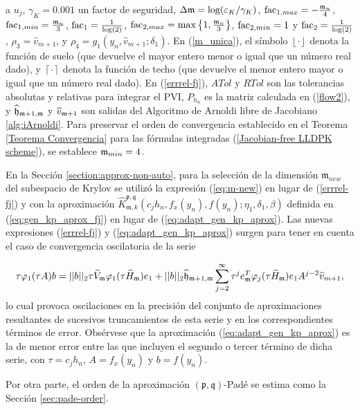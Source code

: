 a $u_j$, $\gamma_{K}=0.001$ un factor de seguridad,
$\Delta\mathfrak{m}=\log(\varepsilon_{K}/\gamma_{K})$,
$\mathrm{fac}_{1,max}= -\frac{\mathfrak{m}_n}{4}$, $\mathrm{fac}_{1,min}= \frac{\mathfrak{m}_n}{3}$, $\mathrm{fac}_1=\frac{1} {\log(2)}$, $\mathrm{fac}_{2,max}= \max\left\{  1,\frac{\mathfrak{m}_{n}}{3}  \right\}$, $\mathrm{fac}_{2,min}= 1 $ y $\mathrm{fac}_2=\frac{1}{\log(2)}$, $\rho_3 =\hat{v}_{m+1}$, y $\rho_4 = g_1(y_n,\hat{v}_ {m+1};\delta_1)$. En (\ref{m_unica}), el símbolo $\left\lfloor \cdot \right\rfloor$ denota la función de suelo (que devuelve el mayor entero menor o igual que un número real dado), y $\left\lceil \cdot \right\rceil$ denota la función de techo (que devuelve el menor entero mayor o igual que un número real dado). En (\ref{errrel-fj}), $ATol$ y $RTol$ son las tolerancias absolutas y relativas para integrar el PVI, $P_{h_n}$ es la matriz calculada en (\ref{flow2}), y $\widehat {\mathfrak{h}}_{\mathfrak{m}+1,\mathfrak{m}}$ y $\widehat{v}_{\mathfrak{m}+1}$ son salidas del Algoritmo de Arnoldi libre de Jacobiano \ref{alg:iArnoldi}. Para preservar el orden de convergencia establecido en el Teorema \ref{Teorema Convergencia} para las fórmulas integradas (\ref{Jacobian-free LLDPK scheme}), se establece $\mathfrak{m}_{min}=4$.
\begin{sloppypar}
En la Sección \ref{section:approx-non-auto}, para la selección de la dimensión $\mathfrak{m}_{new}$ del subespacio de Krylov se utilizó la expresión (\ref{eq:m-new}) en lugar de (\ref{errrel-fj}) y con la aproximación
$\widehat{K}_{\mathfrak{m},k}^{\mathfrak{p},\mathfrak{q}}\left(
c_{j}h_{n},f_{x}(y_{n}),f(y_{n});\eta _{1},\delta _{1},\beta \right)
$ definida en (\ref{eq:gen_kp_aprox_fj}) en lugar de (\ref{eq:adapt_gen_kp_aprox}). Las nuevas expresiones (\ref{errrel-fj}) y (\ref{eq:adapt_gen_kp_aprox}) surgen para tener en cuenta el caso de convergencia oscilatoria de la serie \cite{sidje1998expokit}
\end{sloppypar}
\begin{equation*}
	\tau\varphi_1(\tau A)b=||b||_2\tau \widehat{V}_{\mathfrak{m}} \varphi_1( \tau \widehat{H}_{\mathfrak{m}})e_1 + ||b||_2 \widehat{\mathfrak{h}}_{\mathfrak{m}+1,\mathfrak{m}}
	\sum_{j=2}^{\infty}\tau^{j} e_{\mathfrak{m}}^T\varphi_j(\tau \widehat{H}_{\mathfrak{m}})e_1A^{j-2}\widehat{v}_{m+1},
\end{equation*}
lo cual provoca oscilaciones en la precisión del conjunto de aproximaciones resultantes de sucesivos truncamientos de esta serie y en los correspondientes términos de error. Obsérvese que la aproximación (\ref{eq:adapt_gen_kp_aprox}) es la de menor error entre las que incluyen el segundo o tercer término de dicha serie, con $\tau = c_jh_n$, $A=f_x(y_n)$ y $b=f(y_n)$.

Por otra parte, el orden de la aproximación $(\mathfrak{p},\mathfrak{q})$-Padé se estima como la Sección \ref{sec:pade-order}.

